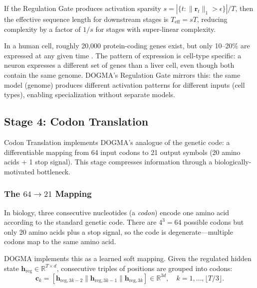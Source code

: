 \begin{proposition}
\label{prop:regulation-sparsity}
If the Regulation Gate produces activation sparsity $s = |\{t : \|\mathbf{r}_t\|_1 > \epsilon\}| / T$, then the effective sequence length for downstream stages is $T_{\text{eff}} = sT$, reducing complexity by a factor of $1/s$ for stages with super-linear complexity.
\end{proposition}

\begin{bioinsight}
In a human cell, roughly 20,000 protein-coding genes exist, but only 10--20\% are expressed at any given time \citep{encode2012}. The pattern of expression is cell-type specific: a neuron expresses a different set of genes than a liver cell, even though both contain the same genome. DOGMA's Regulation Gate mirrors this: the same model (genome) produces different activation patterns for different inputs (cell types), enabling specialization without separate models.
\end{bioinsight}

\subsection{Stage 4: Codon Translation}
\label{sec:stage-codon}

Codon Translation implements DOGMA's analogue of the genetic code: a differentiable mapping from 64 input codons to 21 output symbols (20 amino acids + 1 stop signal). This stage compresses information through a biologically-motivated bottleneck.

\subsubsection{The $64 \to 21$ Mapping}

In biology, three consecutive nucleotides (a \emph{codon}) encode one amino acid according to the standard genetic code. There are $4^3 = 64$ possible codons but only 20 amino acids plus a stop signal, so the code is degenerate---multiple codons map to the same amino acid.

DOGMA implements this as a learned soft mapping. Given the regulated hidden state $\mathbf{h}_{\text{reg}} \in \mathbb{R}^{T \times d}$, consecutive triples of positions are grouped into codons:
\begin{equation}
\mathbf{c}_k = [\mathbf{h}_{\text{reg}, 3k-2} \| \mathbf{h}_{\text{reg}, 3k-1} \| \mathbf{h}_{\text{reg}, 3k}] \in \mathbb{R}^{3d}, \quad k = 1, \ldots, \lfloor T/3 \rfloor.
\label{eq:codon-grouping}
\end{equation}

